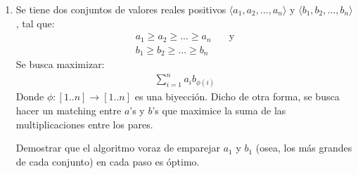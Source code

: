 \documentclass[spanish, fleqn]{article}
\begin{document}
\begin{enumerate}

\item Se tiene dos conjuntos de valores reales positivos $\langle a_1, a_2,...,a_n\rangle$ y $\langle b_1, b_2,...,b_n\rangle$, tal que:
\begin{align*}
a_1 \geq a_2 \geq ... \geq a_n &\quad \text{y}
\\ b_1 \geq b_2 \geq ... \geq b_n
\end{align*}
Se busca maximizar:
\begin{align*}
\sum_{i=1}^n a_{i} b_{\phi(i)}
\end{align*}
Donde $\phi: [1..n] \rightarrow [1..n]$ es una biyección. Dicho de otra forma, se busca hacer un matching entre $a$'s y $b$'s que maximice la suma de las multiplicaciones entre los pares.

Demostrar que el algoritmo voraz de emparejar $a_1$ y $b_1$ (osea, los más grandes de cada conjunto) en cada paso es óptimo.


\end{enumerate}
\end{document}
